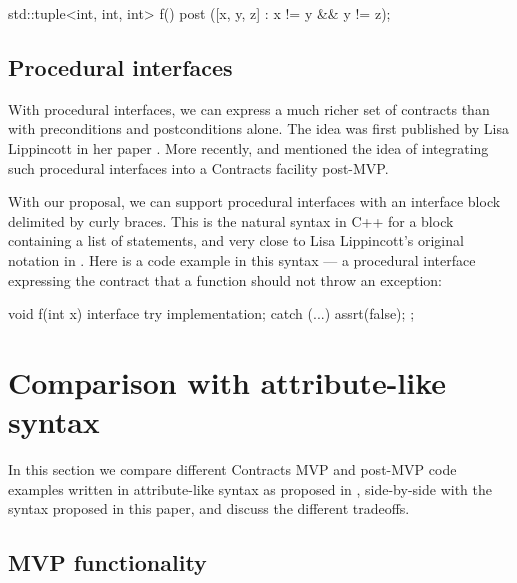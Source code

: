 \vspace{2mm}
\begin{codeblock}
std::tuple<int, int, int> f()
  post ([x, y, z] : x != y && y != z);
\end{codeblock}
\vspace{2mm}

\subsection{Procedural interfaces}
\label{subsec:interfaces}

With procedural interfaces, we can express a much richer set of contracts than with preconditions and postconditions alone. The idea was first published by Lisa Lippincott in her paper \cite{P0465R0}. More recently, \cite{P2885R2} and \cite{P2935R0} mentioned the idea of integrating such procedural interfaces into a Contracts facility post-MVP.

With our proposal, we can support procedural interfaces with an interface block delimited by curly braces. This is the natural syntax in C++ for a block containing a list of statements, and very close to Lisa Lippincott's original notation in \cite{P0465R0}. Here is a code example in this syntax --- a procedural interface expressing the contract that a function should not throw an exception:

\vspace{2mm}
\begin{codeblock}
void f(int x)
interface {
  try {
    implementation;
  } 
  catch (...) {
    assrt(false);
  }
};
\end{codeblock}


\section{Comparison with attribute-like syntax}

In this section we compare different Contracts MVP and post-MVP code examples written in attribute-like syntax as proposed in \cite{P2935R0}, side-by-side with the syntax proposed in this paper, and discuss the different tradeoffs.

\subsection{MVP functionality}

